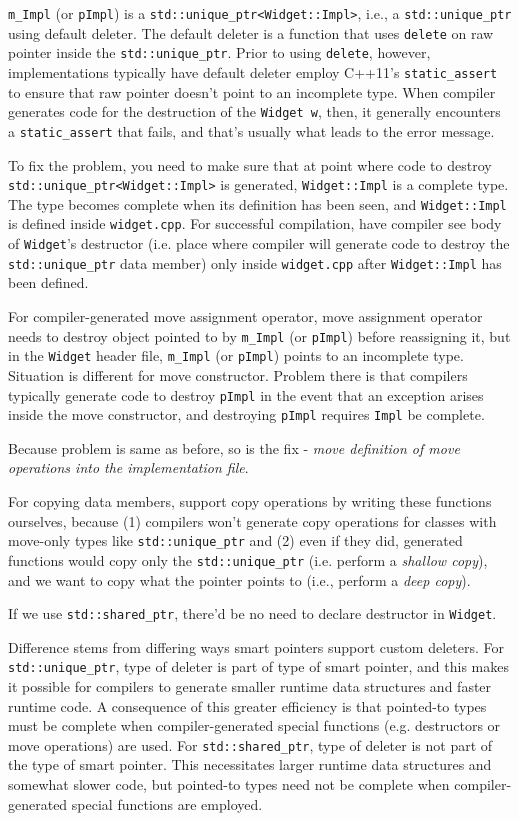 \documentclass[10pt]{amsart}
\begin{document}
\verb|m_Impl| (or \verb|pImpl|) is a \verb|std::unique_ptr<Widget::Impl>|, i.e., a \verb|std::unique_ptr| using default deleter. The default deleter is a function that uses \verb|delete| on raw pointer inside the \verb|std::unique_ptr|.  Prior to using \verb|delete|, however, implementations typically have default deleter employ C++11's \verb|static_assert| to ensure that raw pointer doesn't point to an incomplete type.  When compiler generates code for the destruction of the \verb|Widget w|, then, it generally encounters a \verb|static_assert| that fails, and that's usually what leads to the error message.  

To fix the problem, you need to make sure that at point where code to destroy \verb|std::unique_ptr<Widget::Impl>| is generated, \verb|Widget::Impl| is a complete type.  The type becomes complete when its definition has been seen, and \verb|Widget::Impl| is defined inside \verb|widget.cpp|.  For successful compilation, have compiler see body of \verb|Widget|'s destructor (i.e. place where compiler will generate code to destroy the \verb|std::unique_ptr| data member) only inside \verb|widget.cpp| after \verb|Widget::Impl| has been defined.  

For compiler-generated move assignment operator, move assignment operator needs to destroy object pointed to by \verb|m_Impl| (or \verb|pImpl|) before reassigning it, but in the \verb|Widget| header file, \verb|m_Impl| (or \verb|pImpl|) points to an incomplete type.  Situation is different for move constructor.  Problem there is that compilers typically generate code to destroy \verb|pImpl| in the event that an exception arises inside the move constructor, and destroying \verb|pImpl| requires \verb|Impl| be complete.  

Because problem is same as before, so is the fix - \emph{move definition of move operations into the implementation file}.  

For copying data members, support copy operations by writing these functions ourselves, because (1) compilers won't generate copy operations for classes with move-only types like \verb|std::unique_ptr| and (2) even if they did, generated functions would copy only the \verb|std::unique_ptr| (i.e. perform a \emph{shallow copy}), and we want to copy what the pointer points to (i.e., perform a \emph{deep copy}).  

If we use \verb|std::shared_ptr|, there'd be no need to declare destructor in \verb|Widget|.  

Difference stems from differing ways smart pointers support custom deleters.  For \verb|std::unique_ptr|, type of deleter is part of type of smart pointer, and this makes it possible for compilers to generate smaller runtime data structures and faster runtime code.  A consequence of this greater efficiency is that pointed-to types must be complete when compiler-generated special functions (e.g. destructors or move operations) are used.  For \verb|std::shared_ptr|, type of deleter is not part of the type of smart pointer.  This necessitates larger runtime data structures and somewhat slower code, but pointed-to types need not be complete when compiler-generated special functions are employed.  
\end{document}
